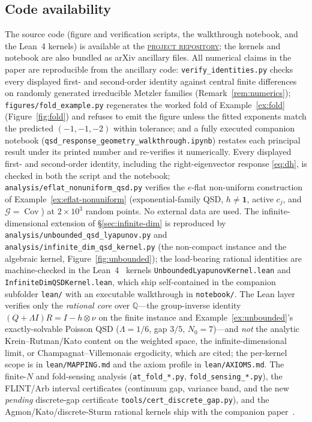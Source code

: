 \documentclass[11pt,reqno]{amsart}
\theoremstyle{plain}
\theoremstyle{definition}
\theoremstyle{remark}
\newcommand{\one}{\mathbf{1}}
\begin{document}
\subsection*{Code availability}
{\sloppy
The source code (figure and verification scripts, the walkthrough notebook, and the Lean~4 kernels) is
available at the \href{https://github.com/asarkar17812/qsd_response_geometry_public}{
\textsf{\textsc{project repository}}}; the kernels and notebook are also bundled as arXiv
ancillary files.
All numerical claims in the paper are reproducible from the ancillary code:
\texttt{verify\_identities.py} checks every displayed first- and second-order
identity against central finite differences on randomly generated irreducible
Metzler families (Remark~\ref{rem:numerics});
\texttt{figures/fold\_example.py} regenerates the worked fold of
Example~\ref{ex:fold} (Figure~\ref{fig:fold}) and refuses to emit the figure
unless the fitted exponents match the predicted $(-1,-1,-2)$ within tolerance;
and a fully executed companion notebook
(\texttt{qsd\_response\_geometry\_walkthrough.ipynb}) restates each principal
result under its printed number and re-verifies it numerically. Every displayed
first- and second-order identity, including the right-eigenvector response
\eqref{eq:dh}, is checked in both the script and the notebook;
\texttt{analysis/eflat\_nonuniform\_qsd.py} verifies the $e$-flat non-uniform
construction of Example~\ref{ex:eflat-nonuniform} (exponential-family QSD, $h\neq\one$,
active $c_j$, and $\mathcal G=\operatorname{Cov}$) at $2\times10^{3}$ random points. No
external data are used.
The infinite-dimensional extension of \S\ref{sec:infinite-dim} is reproduced by
\texttt{analysis/\allowbreak unbounded\_qsd\_lyapunov.py} and
\texttt{analysis/\allowbreak infinite\_dim\_qsd\_kernel.py} (the non-compact instance and the
algebraic kernel, Figure~\ref{fig:unbounded}); the load-bearing rational identities
are machine-checked in the Lean~4~\cite{deMouraUllrich2021} kernels
\texttt{UnboundedLyapunovKernel.lean} and
\texttt{InfiniteDimQSDKernel.lean}, which ship self-contained in the companion subfolder
\texttt{lean/} with an executable walkthrough in \texttt{notebook/}. The Lean layer verifies only
the \emph{rational core} over $\mathbb{Q}$---the group-inverse identity $(Q+\Lambda I)R=I-h\otimes\nu$
on the finite instance and Example~\ref{ex:unbounded}'s exactly-solvable Poisson QSD
($\Lambda=1/6$, gap $3/5$, $N_0=7$)---and \emph{not} the analytic Krein--Rutman/Kato content
on the weighted space, the infinite-dimensional limit, or Champagnat--Villemonais ergodicity,
which are cited; the per-kernel scope is in \texttt{lean/MAPPING.md} and the axiom profile in
\texttt{lean/AXIOMS.md}. The finite-$N$ and fold-sensing analysis
(\texttt{at\_fold\_*.py}, \texttt{fold\_sensing\_*.py}), the FLINT/Arb interval certificates
(continuum gap, variance band, and the new \emph{pending} discrete-gap certificate
\texttt{tools/cert\_discrete\_gap.py}), and the Agmon/Kato/discrete-Sturm rational kernels ship with
the companion paper~\cite{SarkarFoldSensing}.
\par}
\end{document}
